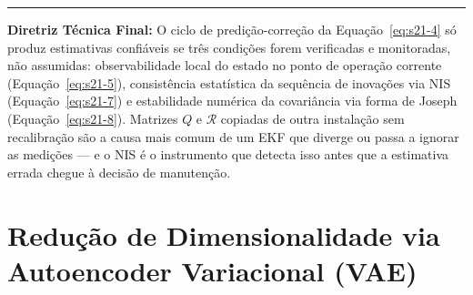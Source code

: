 \documentclass[12pt,a4paper]{article}
\numberwithin{equation}{section}
\numberwithin{table}{section}
\numberwithin{figure}{section}
\begin{document}
{	\vspace{1em}
	\hrule
	\vspace{1em}

	\textbf{Diretriz Técnica Final:} O ciclo de predição-correção da Equação~\eqref{eq:s21-4} só produz estimativas confiáveis se três condições forem verificadas e monitoradas, não assumidas: observabilidade local do estado no ponto de operação corrente (Equação~\eqref{eq:s21-5}), consistência estatística da sequência de inovações via NIS (Equação~\eqref{eq:s21-7}) e estabilidade numérica da covariância via forma de Joseph (Equação~\eqref{eq:s21-8}). Matrizes $Q$ e $\mathcal{R}$ copiadas de outra instalação sem recalibração são a causa mais comum de um EKF que diverge ou passa a ignorar as medições — e o NIS é o instrumento que detecta isso antes que a estimativa errada chegue à decisão de manutenção.

	\clearpage
	\section{Redução de Dimensionalidade via Autoencoder Variacional (VAE)}

}
\end{document}
